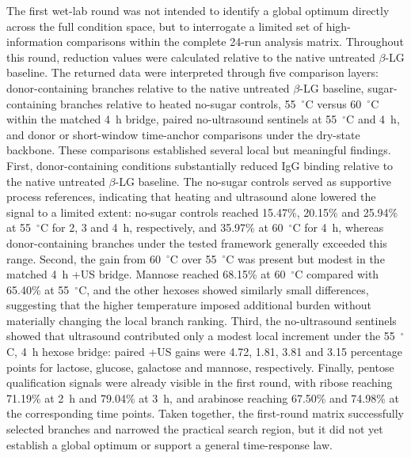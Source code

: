 The first wet-lab round was not intended to identify a global optimum directly across the full condition space, but to interrogate a limited set of high-information comparisons within the complete 24-run analysis matrix. Throughout this round, reduction values were calculated relative to the native untreated $\beta$-LG baseline. The returned data were interpreted through five comparison layers: donor-containing branches relative to the native untreated $\beta$-LG baseline, sugar-containing branches relative to heated no-sugar controls, 55~$^\circ$C versus 60~$^\circ$C within the matched 4~h bridge, paired no-ultrasound sentinels at 55~$^\circ$C and 4~h, and donor or short-window time-anchor comparisons under the dry-state backbone. These comparisons established several local but meaningful findings. First, donor-containing conditions substantially reduced IgG binding relative to the native untreated $\beta$-LG baseline. The no-sugar controls served as supportive process references, indicating that heating and ultrasound alone lowered the signal to a limited extent: no-sugar controls reached 15.47\%, 20.15\% and 25.94\% at 55~$^\circ$C for 2, 3 and 4~h, respectively, and 35.97\% at 60~$^\circ$C for 4~h, whereas donor-containing branches under the tested framework generally exceeded this range. Second, the gain from 60~$^\circ$C over 55~$^\circ$C was present but modest in the matched 4~h +US bridge. Mannose reached 68.15\% at 60~$^\circ$C compared with 65.40\% at 55~$^\circ$C, and the other hexoses showed similarly small differences, suggesting that the higher temperature imposed additional burden without materially changing the local branch ranking. Third, the no-ultrasound sentinels showed that ultrasound contributed only a modest local increment under the 55~$^\circ$C, 4~h hexose bridge: paired +US gains were 4.72, 1.81, 3.81 and 3.15 percentage points for lactose, glucose, galactose and mannose, respectively. Finally, pentose qualification signals were already visible in the first round, with ribose reaching 71.19\% at 2~h and 79.04\% at 3~h, and arabinose reaching 67.50\% and 74.98\% at the corresponding time points. Taken together, the first-round matrix successfully selected branches and narrowed the practical search region, but it did not yet establish a global optimum or support a general time-response law.

